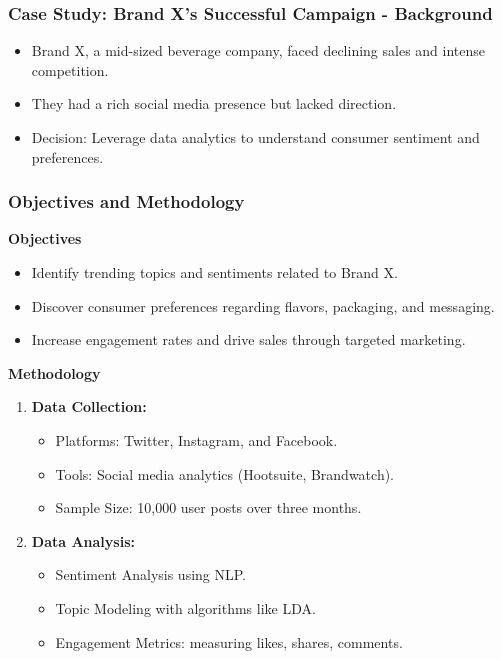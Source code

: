 \documentclass{beamer}
\begin{document}
\begin{frame}[fragile]
    \frametitle{Case Study: Brand X’s Successful Campaign - Background}
    \begin{itemize}
        \item Brand X, a mid-sized beverage company, faced declining sales and intense competition.
        \item They had a rich social media presence but lacked direction.
        \item Decision: Leverage data analytics to understand consumer sentiment and preferences.
    \end{itemize}
\end{frame}

\begin{frame}[fragile]
    \frametitle{Objectives and Methodology}
    \textbf{Objectives}
    \begin{itemize}
        \item Identify trending topics and sentiments related to Brand X.
        \item Discover consumer preferences regarding flavors, packaging, and messaging.
        \item Increase engagement rates and drive sales through targeted marketing.
    \end{itemize}

    \textbf{Methodology}
    \begin{enumerate}
        \item \textbf{Data Collection:}
            \begin{itemize}
                \item Platforms: Twitter, Instagram, and Facebook.
                \item Tools: Social media analytics (Hootsuite, Brandwatch).
                \item Sample Size: 10,000 user posts over three months.
            \end{itemize}
        
        \item \textbf{Data Analysis:}
            \begin{itemize}
                \item Sentiment Analysis using NLP.
                \item Topic Modeling with algorithms like LDA.
                \item Engagement Metrics: measuring likes, shares, comments.
            \end{itemize}
    \end{enumerate}
\end{frame}
\end{document}
